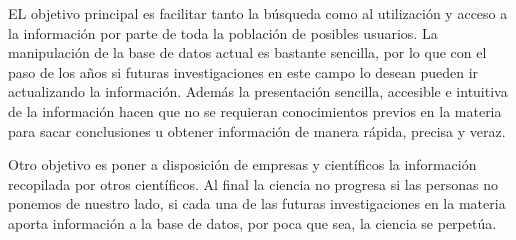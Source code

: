 EL objetivo principal es facilitar tanto la búsqueda como al utilización y acceso a la información por parte de toda la población de posibles usuarios. La manipulación de la base de datos actual es bastante sencilla, por lo que con el paso de los años si futuras investigaciones en este campo lo desean pueden ir actualizando la información. Además la presentación sencilla, accesible e intuitiva de la información hacen que no se requieran conocimientos previos en la materia para sacar conclusiones u obtener información de manera rápida, precisa y veraz. 

Otro objetivo es poner a disposición de empresas y científicos la información recopilada por otros científicos. Al final la ciencia no progresa si las personas no ponemos de nuestro lado, si cada una de las futuras investigaciones en la materia aporta información a la base de datos, por poca que sea, la ciencia se perpetúa. 

